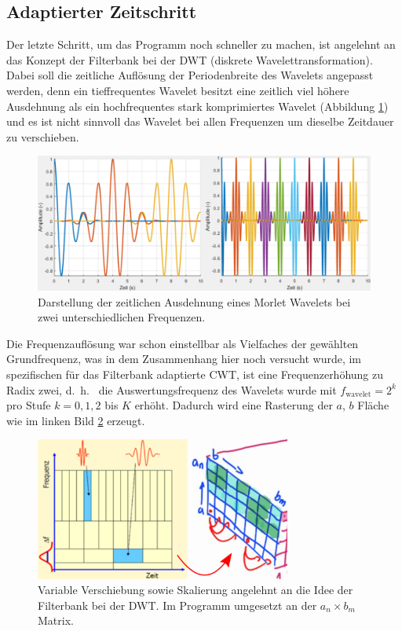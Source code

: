 \subsection{Adaptierter Zeitschritt
	\label{wavelets:subsection:AdaptierterZeitschritt}}
Der letzte Schritt, um das Programm noch schneller zu machen, ist angelehnt an das Konzept der Filterbank bei der DWT (diskrete Wavelettransformation). Dabei soll die zeitliche Auflösung der Periodenbreite des Wavelets angepasst werden, denn ein tieffrequentes Wavelet besitzt eine zeitlich viel höhere Ausdehnung als ein hochfrequentes stark komprimiertes Wavelet (Abbildung \ref{wavelet:fig:adaptedShift_b}) und es ist nicht sinnvoll das Wavelet bei allen Frequenzen um dieselbe Zeitdauer zu verschieben.

\begin{figure}
	\centering
	\includegraphics[width=\textwidth]{papers/wavelets/images/15-1_adaptedShift-b.png}
	\caption{Darstellung der zeitlichen Ausdehnung eines Morlet Wavelets bei zwei unterschiedlichen Frequenzen.}
	\label{wavelet:fig:adaptedShift_b}
\end{figure}

Die Frequenzauflösung war schon einstellbar als Vielfaches der gewählten Grundfrequenz, was in dem Zusammenhang hier noch versucht wurde, im spezifischen für das Filterbank adaptierte CWT, ist eine Frequenzerhöhung zu Radix zwei, d.~h.~ die Auswertungsfrequenz des Wavelets wurde mit $f_\text{wavelet} = 2^k$ pro Stufe $k = 0, 1, 2$ bis $K$ erhöht. Dadurch wird eine Rasterung der $a$, $b$ Fläche wie im linken Bild \ref{wavelet:fig:adaptedFrequndTime} erzeugt.

\begin{figure}
	\centering
	\includegraphics[width=0.75\textwidth]{papers/wavelets/images/15-2_adaptedFrequndTime.png}
	\caption{Variable Verschiebung sowie Skalierung angelehnt an die Idee der Filterbank bei der DWT. Im Programm umgesetzt an der $a_n \times b_m$ Matrix.}
	\label{wavelet:fig:adaptedFrequndTime}
\end{figure}

